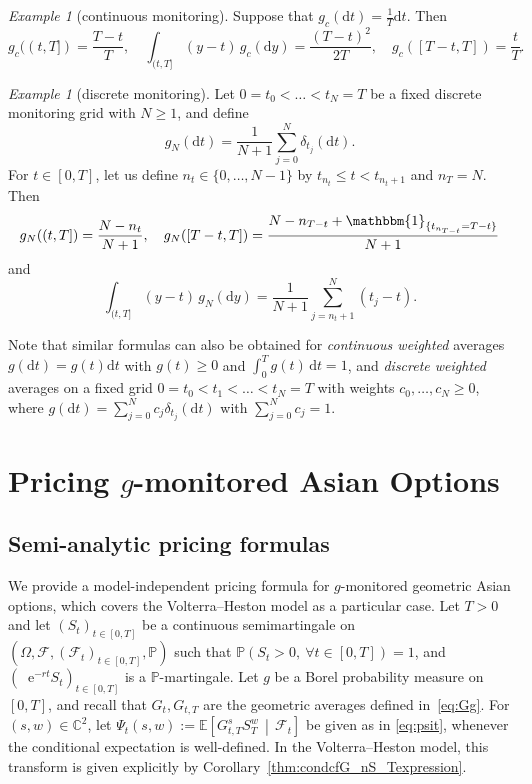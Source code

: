 \documentclass[10pt,a4paper,reqno]{amsart}
\newcommand*{\E}{\mathop{} \mathrm{e}}
\theoremstyle{plain}
\theoremstyle{definition}
\theoremstyle{remark}
\theoremstyle{example}
\newtheorem{example}[theorem]{Example}
\begin{document}
\begin{example}[continuous monitoring]\label{example:continuous}
    Suppose that $g_c(\mathrm{d}t) = \frac{1}{T}\mathrm{d}t$. Then 
    $$
        g_c((t,T]) = \frac{T-t}{T}, \quad \int_{(t,T]}(y-t)\, g_c(\mathrm{d}y) = \frac{(T-t)^2}{2T}, \quad g_c([T-t,T]) = \frac{t}{T}.
    $$
\end{example} 
\begin{example}[discrete monitoring]\label{example:discrete}
    Let $0 = t_0 < \dots < t_N = T$ be a fixed discrete monitoring grid with $N \geq 1$, and define
    $$
      g_{N}(\mathrm{d}t) =  \frac{1}{N+1}\sum_{j=0}^N \delta_{t_j}(\mathrm{d}t).
    $$
	For $t \in [0,T]$, let us define $n_t \in \{0, \dots, N-1\}$ by $t_{n_t}\leq t<t_{n_t+1}$ and $n_T=N$. Then 
    $$
        g_N((t,T]) = \frac{N - n_t}{N+1}, \quad g_N([T-t, T]) = \frac{ N - n_{T-t} + \mathbbm{1}_{\{t_{n_{T-t}} = T-t\}}}{N+1}
    $$
    and 
    $$
        \int_{(t,T]}(y-t)\, g_N(\mathrm{d}y) = \frac{1}{N+1}\sum_{j = n_t + 1}^N (t_j - t).
    $$
\end{example} 

Note that similar formulas can also be obtained for \textit{continuous weighted} averages $g(\mathrm{d}t) = g(t)\mathrm{d}t$ with $g(t)\ge0$ and $\int_0^T g(t)\, \mathrm{d}t = 1$, and \textit{discrete weighted} averages on a fixed grid $0 = t_0 < t_1 < \dots < t_N = T$ with weights $c_0, \dots, c_N \geq 0$, where $g(\mathrm{d}t) = \sum_{j=0}^{N}c_j \delta_{t_j}(\mathrm{d}t)$ with $\sum_{j=0}^{N}c_j = 1$. 


\section{Pricing \texorpdfstring{$g$}{g}-monitored Asian Options}\label{sec:pricing}

\subsection{Semi-analytic pricing formulas}\label{sec:semi-closed-pricing}

We provide a model-independent pricing formula for $g$-monitored geometric Asian options, which covers the Volterra--Heston model as a particular case. Let $T > 0$ and let $(S_t)_{t \in [0,T]}$ be a continuous semimartingale on $(\Omega, \mathcal{F}, (\mathcal{F}_t)_{t \in [0,T]}, \mathbb{P})$ such that $\mathbb{P}(S_t > 0, \ \forall t \in [0,T]) = 1$, and $(\E^{-r t}S_t)_{t\in[0,T]}$ is a $\mathbb{P}$-martingale. Let $g$ be a Borel probability measure on $[0,T]$, and recall that $G_t, G_{t,T}$ are the geometric averages defined in~\eqref{eq:Gg}. For $(s,w)\in\mathbb{C}^2$, let $\Psi_t(s,w) := \mathbb{E}\left[ G_{t,T}^s S_T^w \,\middle|\,\mathcal{F}_t \right]$ be given as in \eqref{eq:psit}, whenever the conditional expectation is well-defined. In the Volterra--Heston model, this transform is given explicitly by Corollary~\ref{thm:condcfG_nS_Texpression}.
\end{document}
